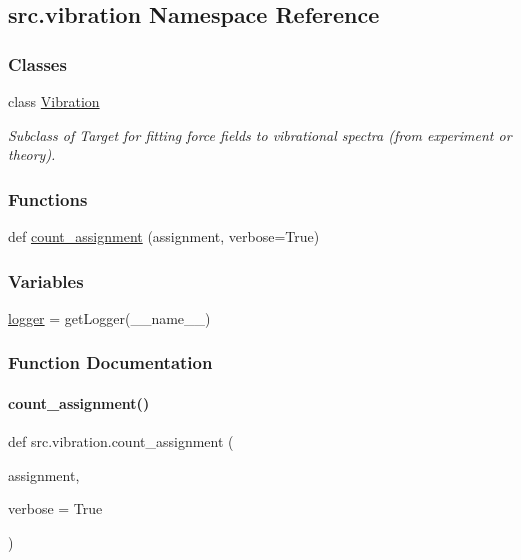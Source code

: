 \hypertarget{namespacesrc_1_1vibration}{}\subsection{src.\+vibration Namespace Reference}
\label{namespacesrc_1_1vibration}
\subsubsection*{Classes}
\begin{DoxyCompactItemize}
\item 
class \hyperlink{classsrc_1_1vibration_1_1Vibration}{Vibration}
\begin{DoxyCompactList}\small\item\em Subclass of Target for fitting force fields to vibrational spectra (from experiment or theory). \end{DoxyCompactList}\end{DoxyCompactItemize}
\subsubsection*{Functions}
\begin{DoxyCompactItemize}
\item 
def \hyperlink{namespacesrc_1_1vibration_a0d1be8669e66ad1f542c4f34e20b5dac}{count\+\_\+assignment} (assignment, verbose=True)
\end{DoxyCompactItemize}
\subsubsection*{Variables}
\begin{DoxyCompactItemize}
\item 
\hyperlink{namespacesrc_1_1vibration_a649ca5a0df765b34d4e7e7e71110acf8}{logger} = get\+Logger(\+\_\+\+\_\+name\+\_\+\+\_\+)
\end{DoxyCompactItemize}


\subsubsection{Function Documentation}
\mbox{\label{namespacesrc_1_1vibration_a0d1be8669e66ad1f542c4f34e20b5dac}} 
\paragraph{\texorpdfstring{count\+\_\+assignment()}{count\_assignment()}}
{\footnotesize\ttfamily def src.\+vibration.\+count\+\_\+assignment (\begin{DoxyParamCaption}\item[{}]{assignment,  }\item[{}]{verbose = {\ttfamily True} }\end{DoxyParamCaption})}



